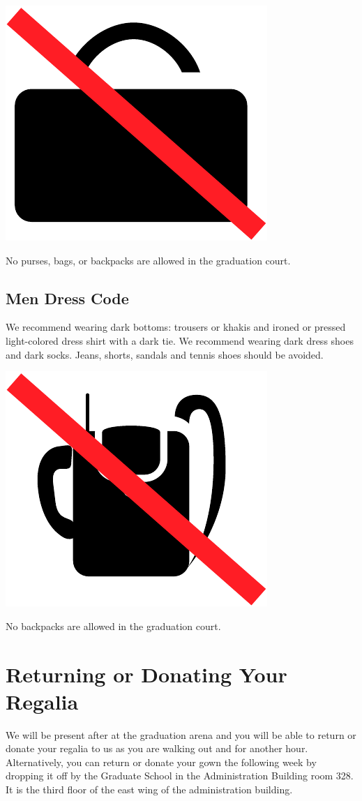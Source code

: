 \documentclass{tufte-handout}
\begin{document}
\begin{marginfigure}[-12\baselineskip]%
\hspace*{0.02in}
  \includegraphics[width=.5\linewidth]{bag}
  \caption{\linespread{1.3}\selectfont{}No purses, bags, or backpacks are allowed in the graduation court.}
  \label{fig:bag}
\end{marginfigure}

\subsection{Men Dress Code}
We recommend wearing dark bottoms: trousers or khakis and ironed or pressed light-colored dress shirt with a dark tie. We recommend wearing dark dress shoes and dark socks. Jeans, shorts, sandals and tennis shoes should be avoided.

\begin{marginfigure}[-4\baselineskip]%
\hspace*{0.02in}
  \includegraphics[width=.5\linewidth]{backpack}
  \caption{\linespread{1.3}\selectfont{}No backpacks are allowed in the graduation court.}
  \label{fig:bag}
\end{marginfigure}

\vspace*{.2\baselineskip} %

\section{Returning or Donating Your Regalia}
We will be present after at the graduation arena and you will be able to return or donate your regalia to us as you are walking out and for another hour.  Alternatively, you can return or donate your gown the following week by dropping it off by the Graduate School in the Administration Building room 328. It is the third floor of the east wing of the administration building.
\end{document}
